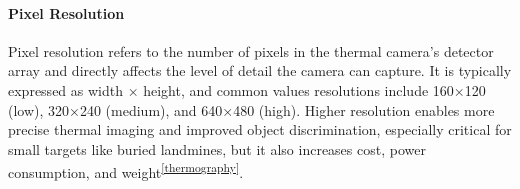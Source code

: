 \begin{table}[H]
    \centering
    \caption{Maximum temperature differences measured by both the thermocouples and the infrared camera and the duration of the cooling phase before they develop~\cite{lamorski2002thermal}.}
    \label{tab:netd_table}
    \small
\end{table}


\paragraph{Pixel Resolution}
Pixel resolution refers to the number of pixels in the thermal camera’s detector array and directly affects the level of detail the camera can capture. It is typically expressed as width × height, and common values resolutions include 160×120 (low), 320×240 (medium), and 640×480 (high). Higher resolution enables more precise thermal imaging and improved object discrimination, especially critical for small targets like buried landmines, but it also increases cost, power consumption, and weight\textsuperscript{\ref{thermography}}. 

